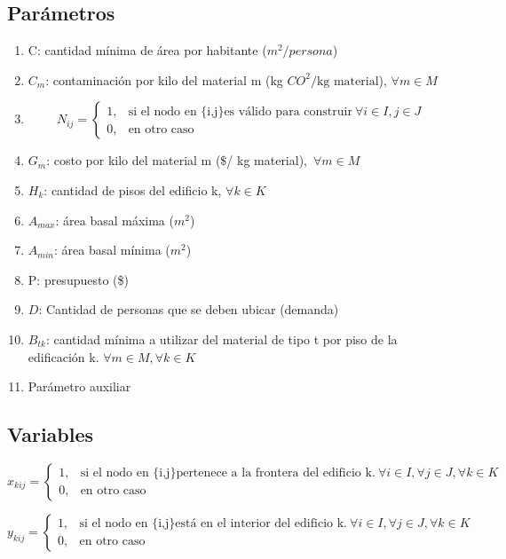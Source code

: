 \documentclass[letterpaper]{article}
\begin{document}
\subsection{Parámetros}
\begin{enumerate}
	\item C: cantidad mínima de área por habitante ($m^2/persona$)
	\item $C_{m}$: contaminación por kilo del material m (kg $CO^{2}/ \text{kg material}$), $\forall m \in M$
	\item $$
	N_{ij}=\begin{cases}
				1, & \text{si el nodo en \{i,j\} es válido para construir}\ \forall i \in I, j \in J\\
				0, & \text{en otro caso}
			 \end{cases}
	$$
	\item $G_{m}$: costo por kilo del material m ($\$$/ kg material),\ $\forall m \in M$
	\item $H_{k}$: cantidad de pisos del edificio k, $\forall k \in K$
	\item $A_{max}$: área basal máxima ($m^2$)
	\item $A_{min}$: área basal mínima ($m^2$)
	\item P: presupuesto (\$)
	\item $D$: Cantidad de personas que se deben ubicar (demanda)
	\item $B_{tk}$: cantidad mínima a utilizar del material de tipo t por piso de la edificación k. $\forall m \in M, \forall k \in K$
 	\item Parámetro auxiliar
\end{enumerate}


\subsection{Variables}
$$
x_{kij}=\begin{cases}
			1, & \text{si el nodo en \{i,j\} pertenece a la frontera del edificio k.}\ \forall i \in I,\forall j \in J,\forall k \in K\\
            0, & \text{en otro caso}
		 \end{cases}
$$

$$
y_{kij}=\begin{cases}
			1, & \text{si el nodo en \{i,j\} está en el interior del edificio k.}\ \forall i \in I,\forall j \in J,\forall k \in K\\
            0, & \text{en otro caso}
		 \end{cases}
$$
\end{document}

